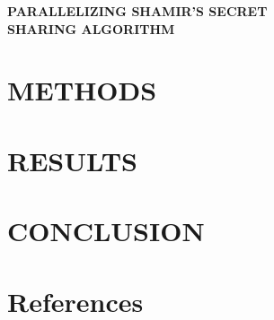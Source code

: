 \documentclass{report}
\begin{document}
\noindent \Large{\textbf{PARALLELIZING SHAMIR'S SECRET \\ SHARING ALGORITHM}}






\section{METHODS}\label{sec3}



\section{RESULTS}\label{sec4}


\section{CONCLUSION}\label{sec5}



\section{References} \label{sec6}

\end{document}
